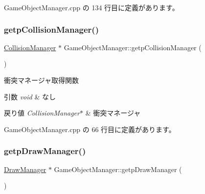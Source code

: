  Game\+Object\+Manager.\+cpp の 134 行目に定義があります。

\mbox{\label{class_game_object_manager_a6bf9e0af21885440429e3e3b07a0451d}} 
\subsubsection{\texorpdfstring{getp\+Collision\+Manager()}{getpCollisionManager()}}
{\footnotesize\ttfamily \mbox{\hyperlink{class_collision_manager}{Collision\+Manager}} $\ast$ Game\+Object\+Manager\+::getp\+Collision\+Manager (\begin{DoxyParamCaption}{ }\end{DoxyParamCaption})}



衝突マネージャ取得関数 


\begin{DoxyParams}{引数}
{\em void} & なし \\
\hline
\end{DoxyParams}

\begin{DoxyRetVals}{戻り値}
{\em Collision\+Manager$\ast$} & 衝突マネージャ \\
\hline
\end{DoxyRetVals}


 Game\+Object\+Manager.\+cpp の 66 行目に定義があります。

\mbox{\label{class_game_object_manager_a6692c72ceb9d059abeba91fd47cf3de7}} 
\subsubsection{\texorpdfstring{getp\+Draw\+Manager()}{getpDrawManager()}}
{\footnotesize\ttfamily \mbox{\hyperlink{class_draw_manager}{Draw\+Manager}} $\ast$ Game\+Object\+Manager\+::getp\+Draw\+Manager (\begin{DoxyParamCaption}{ }\end{DoxyParamCaption})}



